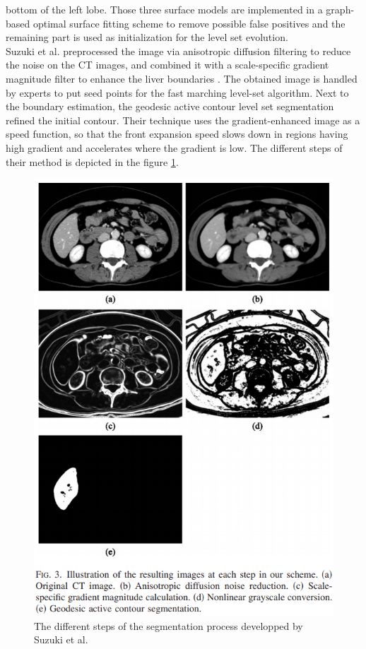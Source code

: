 \documentclass[]{article}
\begin{document}
bottom of the left lobe. Those three surface models are implemented in a
graph-based optimal surface fitting scheme to remove possible false
positives and the remaining part is used as initialization for the level
set evolution.\\
Suzuki et al. preprocessed the image via anisotropic diffusion
filtering to reduce the noise on the CT images, and combined it with a
scale-specific gradient magnitude filter to enhance the liver
boundaries \cite{Suzuki2010}. The obtained image is handled by experts to put seed points
for the fast marching level-set algorithm. Next to the boundary
estimation, the geodesic active contour level set segmentation refined
the initial contour. Their technique uses the gradient-enhanced image as
a speed function, so that the front expansion speed slows down in
regions having high gradient and accelerates where the gradient is low.
The different steps of their method is depicted in the figure \ref{Suzuki2010_Fig3}.

\begin{figure}[ht!]
	\centering
	\includegraphics[width=0.7\linewidth]{images/image24}
	\caption{The different steps of the segmentation process developped by Suzuki et al. \cite{Suzuki2010}}
	\label{Suzuki2010_Fig3}
\end{figure}
\end{document}
